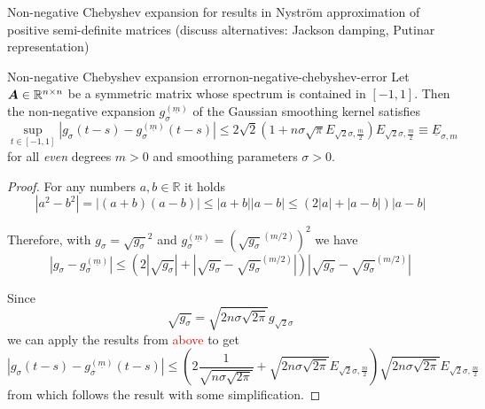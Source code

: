 \documentclass[12pt]{article}
\begin{document}
Non-negative Chebyshev expansion for results in Nyström approximation of positive semi-definite matrices (discuss alternatives: Jackson damping, Putinar representation)

\begin{lemma}{Non-negative Chebyshev expansion error}{non-negative-chebyshev-error}
    Let $\boldsymbol{A} \in \mathbb{R}^{n \times n}$ be a symmetric matrix whose spectrum
    is contained in $[-1, 1]$. Then the non-negative expansion $g_{\sigma}^{(\underline{m})}$ of the Gaussian smoothing kernel satisfies
    \begin{equation}
        \sup_{t \in [-1, 1]} \left| g_{\sigma}(t - s) - g_{\sigma}^{(\underline{m})}(t - s) \right| \leq 2\sqrt{2} \left(1 + n \sigma \sqrt{\pi} E_{\sqrt{2}\sigma, \frac{m}{2}}\right) E_{\sqrt{2}\sigma, \frac{m}{2}} \equiv \underline{E}_{\sigma, m}
        \label{equ:2-chebyshev-interpolation-sup-error-kernel}
    \end{equation}
    for all \emph{even} degrees $m > 0$ and smoothing parameters $\sigma>0$.
\end{lemma}

\begin{proof}

For any numbers $a, b \in \mathbb{R}$ it holds
\begin{equation}
| a^2 - b^2 | = | (a + b)(a - b) |\leq | a + b | | a - b | \leq (2 | a | + | a - b |)  | a - b |
\end{equation}

Therefore, with $g_{\sigma} = \sqrt{g_{\sigma}}^2$ and $g_{\sigma}^{(\underline{m})} = (\sqrt{g_{\sigma}}^{(m/2)})^2$
we have
\begin{equation}
    \left| g_{\sigma} - g_{\sigma}^{(\underline{m})} \right| \leq \left( 2 \left| \sqrt{g_{\sigma}} \right| + \left| \sqrt{g_{\sigma}} - \sqrt{g_{\sigma}}^{(m/2)} \right| \right) \left| \sqrt{g_{\sigma}} - \sqrt{g_{\sigma}}^{(m/2)} \right|
\end{equation}

Since 
\begin{equation}
\sqrt{g_{\sigma}} = \sqrt{2 n \sigma \sqrt{2 \pi}} g_{\sqrt{2}\sigma}
\end{equation}
we can apply the results from \textcolor{red}{above} to get
\begin{equation}
    \left| g_{\sigma}(t - s) - g_{\sigma}^{(\underline{m})}(t - s) \right| \leq \left( 2 \frac{1}{\sqrt{n \sigma \sqrt{2\pi}}} + \sqrt{2 n \sigma \sqrt{2 \pi}} E_{\sqrt{2}\sigma, \frac{m}{2}}\right)\sqrt{2 n \sigma \sqrt{2 \pi}} E_{\sqrt{2}\sigma, \frac{m}{2}}
\end{equation}
from which follows the result with some simplification.
\end{proof}
\end{document}
